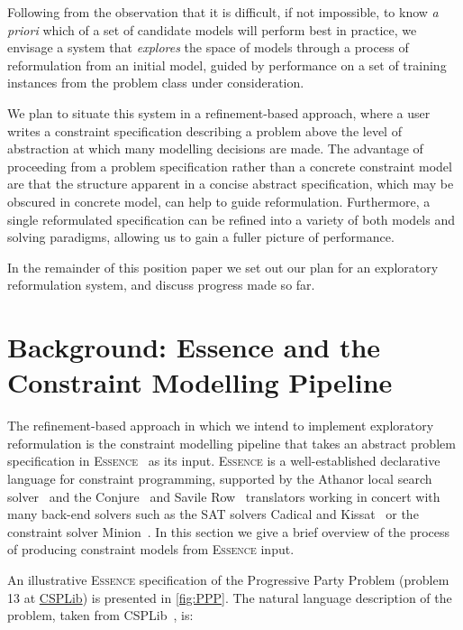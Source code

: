 \documentclass[a4paper,UKenglish,cleveref, autoref,pdfa]{lipics-v2021}
\newcommand{\essence}[0]{\textsc{Essence}\xspace}
\begin{document}
Following from the observation that it is difficult, if not impossible, to know {\em a priori} which of a set of candidate models will perform best in practice, we envisage a system that {\em explores} the space of models through a process of reformulation from an initial model, guided by performance on a set of training instances from the problem class under consideration.

We plan to situate this system in a refinement-based approach, where a user writes a constraint specification describing a problem above the level of abstraction at which many modelling decisions are made. The advantage of proceeding from a problem specification rather than a concrete constraint model are that the structure apparent in a concise abstract specification, which may be obscured in concrete model, can help to guide reformulation. Furthermore, a single reformulated specification can be refined into a variety of both models and solving paradigms, allowing us to gain a fuller picture of performance.

In the remainder of this position paper we set out our plan for an exploratory reformulation system, and discuss progress made so far.


\section{Background: Essence and the Constraint Modelling Pipeline}

The refinement-based approach in which we intend to implement exploratory reformulation is the constraint modelling pipeline that takes an abstract problem specification in \essence~\cite{frisch2008:essence} as its input.
\essence is a well-established declarative language for constraint programming, supported by the Athanor local search solver~\cite{Attieh2019:Athanor} and the Conjure~\cite{Akgun2022:Conjure} and Savile Row~\cite{savilerow} translators working in concert with many back-end solvers such as the SAT solvers Cadical and Kissat~\cite{cadical} or the constraint solver Minion~\cite{Gent2006:minion}.
In this section we give a brief overview of the process of producing constraint models from \essence input.

An illustrative \essence specification of the Progressive Party Problem (problem 13 at \href{https://www.csplib.org/}{CSPLib}) is presented in \cref{fig:PPP}. The natural language description of the problem, taken from CSPLib~\cite{csplib:url}, is:
\end{document}
